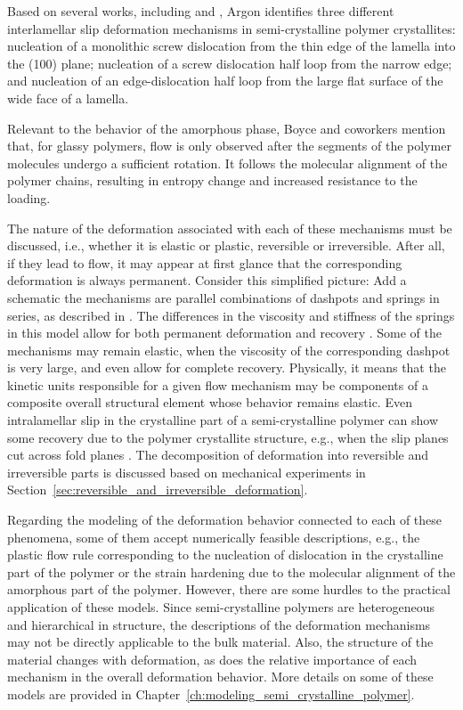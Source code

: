 Based on several works, including \cite{petersonThermalInitiationScrew1966} and \cite{linRateMechanismPlasticity1994}, Argon \citep{argonPhysicsDeformationFracture2013a} identifies three different interlamellar slip deformation mechanisms in semi-crystalline polymer crystallites: nucleation of a monolithic screw dislocation from the thin edge of the lamella into the (100) plane; nucleation of a screw dislocation half loop from the narrow edge; and nucleation of an edge-dislocation half loop from the large flat surface of the wide face of a lamella.

Relevant to the behavior of the amorphous phase, Boyce and coworkers \citep{boyceLargeInelasticDeformation1988} mention that, for glassy polymers, flow is only observed after the segments of the polymer molecules undergo a sufficient rotation.
It follows the molecular alignment of the polymer chains, resulting in entropy change and increased resistance to the loading.

The nature of the deformation associated with each of these mechanisms must be discussed, i.e., whether it is elastic or plastic, reversible or irreversible.
After all, if they lead to flow, it may appear at first glance that the corresponding deformation is always permanent.
Consider this simplified picture: \textcolor{BrickRed}{Add a schematic} the mechanisms are parallel combinations of dashpots and springs in series, as described in \cite{kellerIdentificationStructuralProcesses1971}.
The differences in the viscosity and stiffness of the springs in this model allow for both permanent deformation and recovery \citep{fotheringhamRoleRecoveryForces1978}.
Some of the mechanisms may remain elastic, when the viscosity of the corresponding dashpot is very large, and even allow for complete recovery.
Physically, it means that the kinetic units responsible for a given flow mechanism may be components of a composite overall structural element whose behavior remains elastic.
Even intralamellar slip in the crystalline part of a semi-crystalline polymer can show some recovery due to the polymer crystallite structure, e.g., when the slip planes cut across fold planes \citep{kellerIdentificationStructuralProcesses1971}.
The decomposition of deformation into reversible and irreversible parts is discussed based on mechanical experiments in Section~\ref{sec:reversible_and_irreversible_deformation}.

Regarding the modeling of the deformation behavior connected to each of these phenomena, some of them accept numerically feasible descriptions, e.g., the plastic flow rule corresponding to the nucleation of dislocation in the crystalline part of the polymer or the strain hardening due to the molecular alignment of the amorphous part of the polymer.
However, there are some hurdles to the practical application of these models.
Since semi-crystalline polymers are heterogeneous and hierarchical in structure, the descriptions of the deformation mechanisms may not be directly applicable to the bulk material.
Also, the structure of the material changes with deformation, as does the relative importance of each mechanism in the overall deformation behavior.
More details on some of these models are provided in Chapter~\ref{ch:modeling_semi_crystalline_polymer}.

